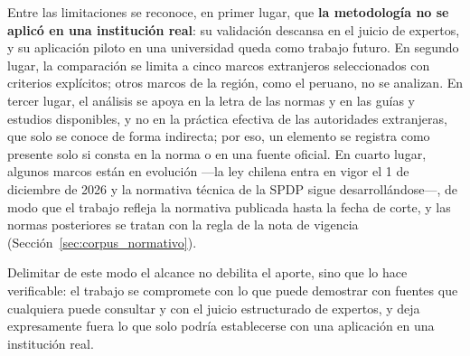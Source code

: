 Entre las limitaciones se reconoce, en primer lugar, que \textbf{la metodología no se aplicó en una institución real}: su validación descansa en el juicio de expertos, y su aplicación piloto en una universidad queda como trabajo futuro. En segundo lugar, la comparación se limita a cinco marcos extranjeros seleccionados con criterios explícitos; otros marcos de la región, como el peruano, no se analizan. En tercer lugar, el análisis se apoya en la letra de las normas y en las guías y estudios disponibles, y no en la práctica efectiva de las autoridades extranjeras, que solo se conoce de forma indirecta; por eso, un elemento se registra como presente solo si consta en la norma o en una fuente oficial. En cuarto lugar, algunos marcos están en evolución ---la ley chilena entra en vigor el 1 de diciembre de 2026 y la normativa técnica de la SPDP sigue desarrollándose---, de modo que el trabajo refleja la normativa publicada hasta la fecha de corte, y las normas posteriores se tratan con la regla de la nota de vigencia (Sección~\ref{sec:corpus_normativo}).

Delimitar de este modo el alcance no debilita el aporte, sino que lo hace verificable: el trabajo se compromete con lo que puede demostrar con fuentes que cualquiera puede consultar y con el juicio estructurado de expertos, y deja expresamente fuera lo que solo podría establecerse con una aplicación en una institución real.
